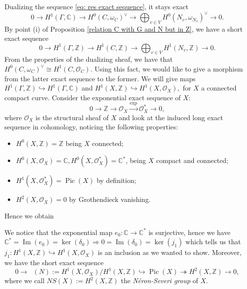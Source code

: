 \documentclass[a4paper,12 pt,titlepage,twoside]{book}
\newcommand{\numberset}{\mathbb}
\newcommand{\Z}{\numberset{Z}}
\newcommand{\C}{\numberset{C}}
\newcommand{\os}{\mathcal{O}}
\DeclareMathOperator{\Ima}{Im}
\DeclareMathOperator{\pic}{Pic}
\DeclareMathOperator{\pico}{Pic^0}
\theoremstyle{plain}
\theoremstyle{theorem}
\theoremstyle{definition}
\theoremstyle{remark}
\begin{document}
	Dualizing the sequence \eqref{eq: res exact sequence}, it stays exact $$0 \rightarrow H^1(\Gamma, \C) \rightarrow H^0(C, \omega_C)^\vee \rightarrow \bigoplus_{v \in V} H^0(N_v,\omega_{N_v})^\vee \rightarrow 0.$$ By point (i) of Proposition \ref{relation C with G and N but in Z}, we have a short exact sequence $$0 \rightarrow H^1(\Gamma,\Z) \rightarrow H^1(C,\Z) \rightarrow \bigoplus_{v \in V}H^1(N_v,\Z) \rightarrow 0.$$ From the properties of the dualizing sheaf, we have that $H^0(C, \omega_C)^\vee \cong H^1(C,\os_C).$ Using this fact, we would like to give a morphism from the latter exact sequence to the former. We will give maps $H^1(\Gamma, \Z) \hookrightarrow H^1(\Gamma,\C)$ and $H^1(X,\Z) \hookrightarrow H^1(X,\os_X),$ for $X$ a connected compact curve. Consider the exponential exact sequence of $X$: $$0 \rightarrow \Z \rightarrow \os_X \stackrel{\exp}{\longrightarrow} \os_X^* \rightarrow 0,$$ where $\os_X$ is the structural sheaf of $X$ and look at the induced long exact sequence in cohomology, noticing the following properties: \begin{itemize}
		\item $H^0(X,\Z) = \Z$ being $X$ connected;
		\item $H^0(X,\os_X) = \C, H^0(X,\os_X^*) = \C^*$, being $X$ compact and connected;
		\item $H^1(X,\os_X^*) = \pic(X)$ by definition;
		\item $H^2(X,\os_X)=0$ by Grothendieck vanishing.
	\end{itemize} Hence we obtain 
	\begin{center}
	\end{center}
	We notice that the exponential map $e_0 \colon \C \rightarrow \C^*$ is surjective, hence we have $\C^* = \Ima(e_0) = \ker(\delta_0) \Rightarrow 0=\Ima(\delta_0) = \ker(j_1)$ which tells us that $j_1 \colon H^1(X,\Z) \hookrightarrow H^1(X,\os_X)$ is an inclusion as we wanted to show. Moreover, we have the short exact sequence $$ 0 \rightarrow \pico(N) := H^1(X,\os_X)/H^1(X,\Z) \hookrightarrow \pic(X) \twoheadrightarrow H^2(X,\Z) \rightarrow 0,$$ where we call $NS(X) := H^2(X,\Z)$ the \emph{Néron-Severi group} of $X$. \\
	
\end{document}

